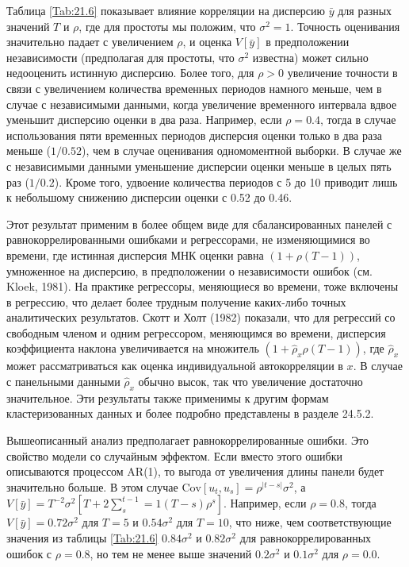 Таблица \ref{Tab:21.6} показывает влияние корреляции на дисперсию $\bar{y}$ для разных значений $T$ и $\rho$, где для простоты мы положим, что $\sigma^2=1$. Точность оценивания значительно падает с увеличением $\rho$, и оценка $V[\bar{y}]$ в предположении независимости (предполагая для простоты, что $\sigma^2$ известна) может сильно недооценить истинную дисперсию. Более того, для $\rho > 0$ увеличение точности в связи с увеличением количества временных периодов намного меньше, чем в случае с независимыми данными, когда увеличение временного интервала вдвое уменьшит дисперсию оценки в два раза. Например, если $\rho=0.4$, тогда в случае использования пяти временных периодов дисперсия оценки только в два раза меньше ($1/0.52$), чем в случае оценивания одномоментной выборки. В случае же с независимыми данными уменьшение дисперсии оценки меньше в целых пять раз ($1/0.2$). Кроме того, удвоение количества периодов с 5 до 10 приводит лишь к небольшому снижению дисперсии оценки с 0.52 до 0.46.

Этот результат применим в более общем виде для сбалансированных панелей с равнокоррелированными ошибками и регрессорами, не изменяющимися во времени, где истинная дисперсия МНК оценки равна $(1+\rho(T-1))$, умноженное на дисперсию, в предположении о независимости ошибок (см. Kloek, 1981). На практике регрессоры, меняющиеся во времени, тоже включены в регрессию, что делает более трудным получение каких-либо точных аналитических результатов. Скотт и Холт (1982) показали, что для регрессий со свободным членом и одним регрессором, меняющимся во времени, дисперсия коэффициента наклона увеличивается на множитель $(1+\hat{\rho}_x\rho(T-1))$, где $\hat{\rho}_x$ может рассматриваться как оценка индивидуальной автокорреляции в $x$. В случае с панельными данными  $\hat{\rho}_x$ обычно высок, так что увеличение достаточно значительное. Эти результаты также применимы к другим формам кластеризованных  данных и более подробно представлены в разделе 24.5.2.

Вышеописанный анализ предполагает равнокоррелированные ошибки. Это свойство модели со случайным эффектом. Если вместо этого ошибки описываются процессом AR(1), то выгода от увеличения длины панели будет значительно больше. В этом случае $\mathrm{Cov}[u_{t}, u_{s}]=\rho^{|t-s|}\sigma^2$, а $V[\bar{y}]=T^{-2}\sigma^2[T+2\sum^{t-1}_s=1(T-s)\rho^s]$. Например, если $\rho=0.8$, тогда $V[\bar{y}]=0.72\sigma^2$ для $T=5$ и $0.54\sigma^2$ для $T=10$, что ниже, чем соответствующие значения из таблицы \ref{Tab:21.6} $0.84\sigma^2$ и $0.82\sigma^2$ для равнокоррелированных ошибок с $\rho=0.8$, но тем не менее выше значений $0.2\sigma^2$ и $0.1\sigma^2$ для $\rho=0.0$.

